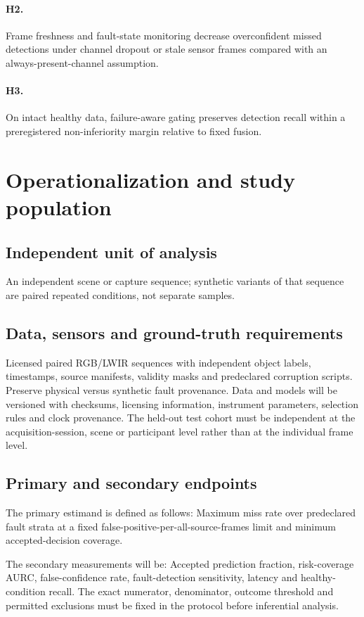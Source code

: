 \documentclass[11pt,a4paper]{article}
\begin{document}
\paragraph{H2.} Frame freshness and fault-state monitoring decrease overconfident missed detections under channel dropout or stale sensor frames compared with an always-present-channel assumption.

\paragraph{H3.} On intact healthy data, failure-aware gating preserves detection recall within a preregistered non-inferiority margin relative to fixed fusion.

\section{Operationalization and study population}
\subsection{Independent unit of analysis}
An independent scene or capture sequence; synthetic variants of that sequence are paired repeated conditions, not separate samples.

\subsection{Data, sensors and ground-truth requirements}
Licensed paired RGB/LWIR sequences with independent object labels, timestamps, source manifests, validity masks and predeclared corruption scripts. Preserve physical versus synthetic fault provenance. Data and models will be versioned with checksums, licensing information, instrument parameters, selection rules and clock provenance. The held-out test cohort must be independent at the acquisition-session, scene or participant level rather than at the individual frame level.

\subsection{Primary and secondary endpoints}
The primary estimand is defined as follows: Maximum miss rate over predeclared fault strata at a fixed false-positive-per-all-source-frames limit and minimum accepted-decision coverage.

The secondary measurements will be: Accepted prediction fraction, risk-coverage AURC, false-confidence rate, fault-detection sensitivity, latency and healthy-condition recall. The exact numerator, denominator, outcome threshold and permitted exclusions must be fixed in the protocol before inferential analysis.
\end{document}
